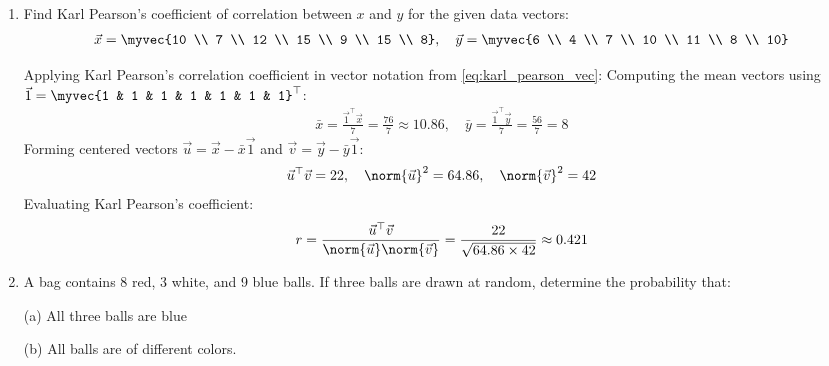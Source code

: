 \begin{enumerate}[label=\thesubsection.\arabic*, ref=\thesubsection.\theenumi]
	\item Find Karl Pearson's coefficient of correlation between $x$ and $y$ for the given data vectors:
	\begin{align*}
		\vec{x} = \myvec{10 \\ 7 \\ 12 \\ 15 \\ 9 \\ 15 \\ 8}, \quad \vec{y} = \myvec{6 \\ 4 \\ 7 \\ 10 \\ 11 \\ 8 \\ 10}
	\end{align*}
	\hfill {}
	
	\solution
	Applying Karl Pearson's correlation coefficient in vector notation from \eqref{eq:karl_pearson_vec}:
	Computing the mean vectors using $\vec{1} = \myvec{1 & 1 & 1 & 1 & 1 & 1 & 1}^{\top}$:
	\begin{align}
		\bar{x} = \frac{\vec{1}^{\top}\vec{x}}{7} = \frac{76}{7} \approx 10.86, \quad \bar{y} = \frac{\vec{1}^{\top}\vec{y}}{7} = \frac{56}{7} = 8
	\end{align}
	Forming centered vectors $\vec{u} = \vec{x} - \bar{x}\vec{1}$ and $\vec{v} = \vec{y} - \bar{y}\vec{1}$:
	\begin{align}
		\vec{u}^{\top}\vec{v} = 22, \quad \norm{\vec{u}}^2 = 64.86, \quad \norm{\vec{v}}^2 = 42
	\end{align}
	Evaluating Karl Pearson's coefficient:
	\begin{align}
		r = \frac{\vec{u}^{\top}\vec{v}}{\norm{\vec{u}}\norm{\vec{v}}} = \frac{22}{\sqrt{64.86 \times 42}} \approx 0.421
	\end{align}
	
	\item A bag contains 8 red, 3 white, and 9 blue balls. If three balls are drawn at random, determine the probability that:
	
	(a) All three balls are blue
	
	(b) All balls are of different colors. \hfill {}
	

\end{enumerate}
